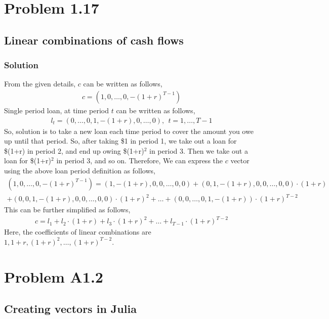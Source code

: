\documentclass{article}
\begin{document}
\section*{Problem 1.17}
\subsection*{Linear combinations of cash flows}
\subsubsection*{Solution}
  From the given details, $c$ can be written as follows, 
  \begin{align*}
      c = (1,0,\ldots,0,-(1+r)^{T-1})
  \end{align*}
Single period loan, at time period $t$ can be written as follows,
\begin{align*}
    l_t = (0,\ldots,0,1,-(1+r),0,\ldots,0),\ \  t = 1,\ldots,T-1
\end{align*}
So, solution is to take a new loan each time period to cover the amount you owe up until that period. So, after taking \$1 in period 1, we take out a loan for \$(1+r) in period 2, and end up owing \$(1+r)$^2$ in period 3. Then we take out a loan for \$(1+r)$^2$ in period 3, and so on. Therefore, We can express the $c$ vector using the above loan period definition as follows,
\begin{align*}
    (1,0,\ldots,0,-(1+r)^{T-1}) = (1,-(1+r),0,0,\ldots,0,0) + (0,1,-(1+r),0,0,\ldots,0,0)\cdot(1+r) \\  + (0,0,1,-(1+r),0,0,\ldots,0,0)\cdot(1+r)^2 + \ldots + (0,0,\ldots,0,1,-(1+r))\cdot(1+r)^{T-2}  
\end{align*}
This can be further simplified as follows,
\begin{align*}
    c = l_1 + l_2\cdot(1+r) + l_3\cdot(1+r)^2 + \ldots + l_{T-1}\cdot(1+r)^{T-2}
\end{align*}
Here, the coefficients of linear combinations are $1, 1+r, (1+r)^2, \ldots, (1+r)^{T-2}$.
\section*{Problem A1.2}
\subsection*{Creating vectors in Julia}
\end{document}

